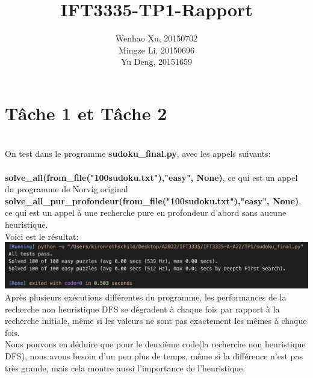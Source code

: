\documentclass{article}
\title{IFT3335-TP1-Rapport}
\author{Wenhao Xu, 20150702\\
Mingze Li, 20150696\\
Yu Deng, 20151659}
\date{}
\begin{document}
\maketitle

\section*{Tâche 1 et Tâche 2}\\
On test dans le programme \textbf{sudoku\_final.py}, avec les appels suivants:\\\\
\textbf{solve\_all(from\_file("100sudoku.txt"),"easy", None)}, ce qui est un appel du programme de Norvig original\\
\textbf{solve\_all\_pur\_profondeur(from\_file("100sudoku.txt"),"easy", None)}, ce qui est un appel à une recherche pure en profondeur d’abord sans aucune heuristique.\\
Voici est le résultat:\\
\includegraphics[width=1\textwidth]{t2.png}\\
Après plusieurs exécutions différentes du programme, les performances de la recherche non heuristique DFS se dégradent à chaque fois par rapport à la recherche initiale, même si les valeurs ne sont pas exactement les mêmes à chaque fois.\\
Nous pouvons en déduire que pour le deuxième code(la recherche non heuristique DFS), nous avons besoin d'un peu plus de temps, même si la différence n'est pas très grande, mais cela montre aussi l'importance de l'heuristique.
\end{document}
